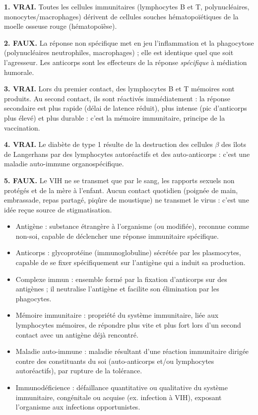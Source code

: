 \documentclass[11pt]{article}
\newcommand{\cle}[1]{{\popxbold\color{popdark}#1}}
\begin{document}
\begin{corrige}

\textbf{1. VRAI.} Toutes les cellules immunitaires (lymphocytes B et T, polynucléaires, monocytes/macrophages) dérivent de \cle{cellules souches hématopoïétiques} de la moelle osseuse rouge (hématopoïèse).

\textbf{2. FAUX.} La réponse non spécifique met en jeu l'inflammation et la phagocytose (polynucléaires neutrophiles, macrophages) ; elle est identique quel que soit l'agresseur. Les anticorps sont les effecteurs de la réponse \emph{spécifique} à médiation humorale.

\textbf{3. VRAI.} Lors du premier contact, des lymphocytes B et T \cle{mémoires} sont produits. Au second contact, ils sont réactivés immédiatement : la réponse secondaire est plus rapide (délai de latence réduit), plus intense (pic d'anticorps plus élevé) et plus durable : c'est la \cle{mémoire immunitaire}, principe de la vaccination.

\textbf{4. VRAI.} Le diabète de type 1 résulte de la destruction des cellules $\beta$ des îlots de Langerhans par des lymphocytes autoréactifs et des auto-anticorps : c'est une \cle{maladie auto-immune} organospécifique.

\textbf{5. FAUX.} Le VIH ne se transmet que par le sang, les rapports sexuels non protégés et de la mère à l'enfant. Aucun contact quotidien (poignée de main, embrassade, repas partagé, piqûre de moustique) ne transmet le virus : c'est une idée reçue source de stigmatisation.
\end{corrige}

\begin{corrige}

\begin{itemize}
\item \cle{Antigène} : substance étrangère à l'organisme (ou modifiée), reconnue comme non-soi, capable de déclencher une réponse immunitaire spécifique.
\item \cle{Anticorps} : glycoprotéine (immunoglobuline) sécrétée par les plasmocytes, capable de se fixer spécifiquement sur l'antigène qui a induit sa production.
\item \cle{Complexe immun} : ensemble formé par la fixation d'anticorps sur des antigènes ; il neutralise l'antigène et facilite son élimination par les phagocytes.
\item \cle{Mémoire immunitaire} : propriété du système immunitaire, liée aux lymphocytes mémoires, de répondre plus vite et plus fort lors d'un second contact avec un antigène déjà rencontré.
\item \cle{Maladie auto-immune} : maladie résultant d'une réaction immunitaire dirigée contre des constituants du soi (auto-anticorps et/ou lymphocytes autoréactifs), par rupture de la tolérance.
\item \cle{Immunodéficience} : défaillance quantitative ou qualitative du système immunitaire, congénitale ou acquise (ex. infection à VIH), exposant l'organisme aux infections opportunistes.
\end{itemize}
\end{corrige}
\end{document}
